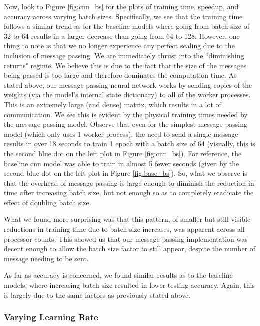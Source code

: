 \documentclass{article}
\begin{document}
Now, look to Figure \ref{fig:cnn_bs} for the plots of training time, speedup, and accuracy across varying batch sizes. Specifically, we see that the training time follows a similar trend as for the baseline models where going from batch size of 32 to 64 results in a larger decrease than going from 64 to 128. However, one thing to note is that we no longer experience any perfect scaling due to the inclusion of message passing. We are immediately thrust into the ``diminishing returns" regime. We believe this is due to the fact that the size of the messages being passed is too large and therefore dominates the computation time. As stated above, our message passing neural network works by sending copies of the weights (via the model's internal state dictionary) to all of the worker processes. This is an extremely large (and dense) matrix, which results in a lot of communication. We see this is evident by the physical training times needed by the message passing model. Observe that even for the simplest message passing model (which only uses 1 worker process), the need to send a single message results in over 18 seconds to train 1 epoch with a batch size of 64 (visually, this is the second blue dot on the left plot in Figure \ref{fig:cnn_bs}). For reference, the baseline cnn model was able to train in almost 5 fewer seconds (given by the second blue dot on the left plot in Figure \ref{fig:base_bs}). So, what we observe is that the overhead of message passing is large enough to diminish the reduction in time after increasing batch size, but not enough so as to completely eradicate the effect of doubling batch size.

What we found more surprising was that this pattern, of smaller but still visible reductions in training time due to batch size increases, was apparent across all processor counts. This showed us that our message passing implementation was decent enough to allow the batch size factor to still appear, despite the number of message needing to be sent.

As far as accuracy is concerned, we found similar results as to the baseline models, where increasing batch size resulted in lower testing accuracy. Again, this is largely due to the same factors as previously stated above.

\subsubsection{Varying Learning Rate}
\end{document}
